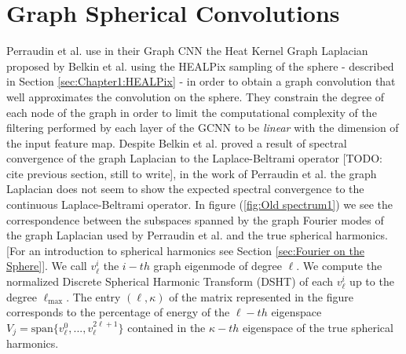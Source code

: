 

\section{Graph Spherical Convolutions}
Perraudin et al. \cite{DeepSphere} use in their Graph CNN the Heat Kernel Graph Laplacian proposed by Belkin et al. \cite{Belkin:2005:TTF:2138147.2138189} using the HEALPix sampling of the sphere - described in Section \ref{sec:Chapter1:HEALPix} - in order to obtain a graph convolution that well approximates the convolution on the sphere. They constrain the degree of each node of the graph in order to limit the computational complexity of the filtering performed by each layer of the GCNN to be \textit{linear} with the dimension of the input feature map. Despite Belkin et al. proved a result of spectral convergence of the graph Laplacian to the Laplace-Beltrami operator [TODO: cite previous section, still to write], in the work of Perraudin et al. the graph Laplacian does not seem to show the expected spectral convergence to the continuous Laplace-Beltrami operator. In figure (\ref{fig:Old spectrum1}) we see the correspondence between the subspaces spanned by the graph Fourier modes of the graph Laplacian used by Perraudin et al. and the true spherical harmonics. [For an introduction to spherical harmonics see Section \ref{sec:Fourier on the Sphere}]. We call $v_\ell^i$ the $i-th$ graph eigenmode of degree $\ell$. We compute the normalized Discrete Spherical Harmonic Transform (DSHT) of each $v^i_\ell$ up to the degree $\ell_\text{max}$. The entry $(\ell, \kappa)$ of the matrix represented in the figure corresponds to the percentage of energy of the $\ell-th$ eigenspace $V_j = \text{span}\{v^0_\ell, ..., v^{2\ell+1}_\ell\}$ contained in the $\kappa-th$ eigenspace of the true spherical harmonics. 
